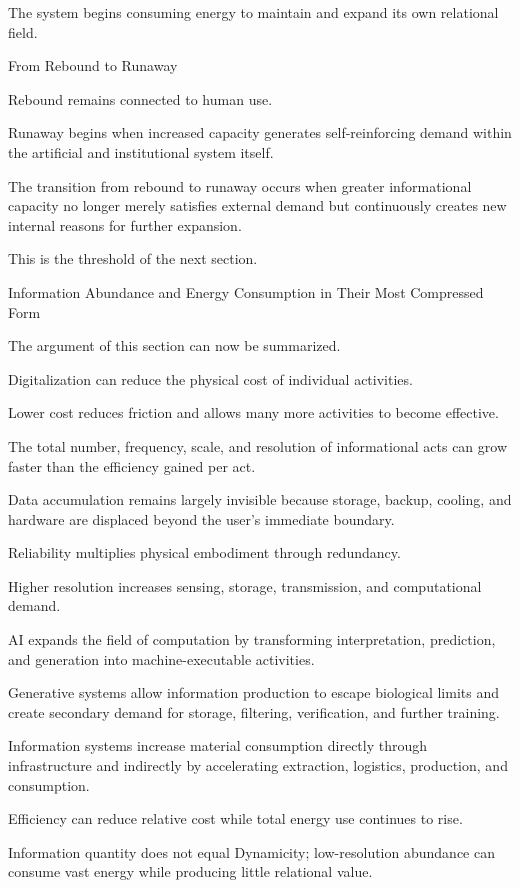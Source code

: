 The system begins consuming energy to maintain and expand its own relational field.

From Rebound to Runaway

Rebound remains connected to human use.

Runaway begins when increased capacity generates self-reinforcing demand within the artificial and institutional system itself.

The transition from rebound to runaway occurs when greater informational capacity no longer merely satisfies external demand but continuously creates new internal reasons for further expansion.

This is the threshold of the next section.

Information Abundance and Energy Consumption in Their Most Compressed Form

The argument of this section can now be summarized.

Digitalization can reduce the physical cost of individual activities.

Lower cost reduces friction and allows many more activities to become effective.

The total number, frequency, scale, and resolution of informational acts can grow faster than the efficiency gained per act.

Data accumulation remains largely invisible because storage, backup, cooling, and hardware are displaced beyond the user’s immediate boundary.

Reliability multiplies physical embodiment through redundancy.

Higher resolution increases sensing, storage, transmission, and computational demand.

AI expands the field of computation by transforming interpretation, prediction, and generation into machine-executable activities.

Generative systems allow information production to escape biological limits and create secondary demand for storage, filtering, verification, and further training.

Information systems increase material consumption directly through infrastructure and indirectly by accelerating extraction, logistics, production, and consumption.

Efficiency can reduce relative cost while total energy use continues to rise.

Information quantity does not equal Dynamicity; low-resolution abundance can consume vast energy while producing little relational value.

